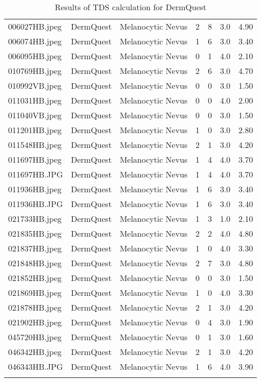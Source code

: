 \begin{longtable}{ | l | l | l | l | l | l | l |}
006027HB.jpeg & DermQuest & Melanocytic Nevus & 2 & 8 & 3.0 & 4.90 \\
006074HB.jpeg & DermQuest & Melanocytic Nevus & 1 & 6 & 3.0 & 3.40 \\
006095HB.jpeg & DermQuest & Melanocytic Nevus & 0 & 1 & 4.0 & 2.10 \\
010769HB.jpeg & DermQuest & Melanocytic Nevus & 2 & 6 & 3.0 & 4.70 \\
010992VB.jpeg & DermQuest & Melanocytic Nevus & 0 & 0 & 3.0 & 1.50 \\
011031HB.jpeg & DermQuest & Melanocytic Nevus & 0 & 0 & 4.0 & 2.00 \\
011040VB.jpeg & DermQuest & Melanocytic Nevus & 0 & 0 & 3.0 & 1.50 \\
011201HB.jpeg & DermQuest & Melanocytic Nevus & 1 & 0 & 3.0 & 2.80 \\
011548HB.jpeg & DermQuest & Melanocytic Nevus & 2 & 1 & 3.0 & 4.20 \\
011697HB.jpeg & DermQuest & Melanocytic Nevus & 1 & 4 & 4.0 & 3.70 \\
011697HB.JPG & DermQuest & Melanocytic Nevus & 1 & 4 & 4.0 & 3.70 \\
011936HB.jpeg & DermQuest & Melanocytic Nevus & 1 & 6 & 3.0 & 3.40 \\
011936HB.JPG & DermQuest & Melanocytic Nevus & 1 & 6 & 3.0 & 3.40 \\
021733HB.jpeg & DermQuest & Melanocytic Nevus & 1 & 3 & 1.0 & 2.10 \\
021835HB.jpeg & DermQuest & Melanocytic Nevus & 2 & 2 & 4.0 & 4.80 \\
021837HB.jpeg & DermQuest & Melanocytic Nevus & 1 & 0 & 4.0 & 3.30 \\
021848HB.jpeg & DermQuest & Melanocytic Nevus & 2 & 7 & 3.0 & 4.80 \\
021852HB.jpeg & DermQuest & Melanocytic Nevus & 0 & 0 & 3.0 & 1.50 \\
021869HB.jpeg & DermQuest & Melanocytic Nevus & 1 & 0 & 4.0 & 3.30 \\
021878HB.jpeg & DermQuest & Melanocytic Nevus & 2 & 1 & 3.0 & 4.20 \\
021902HB.jpeg & DermQuest & Melanocytic Nevus & 0 & 4 & 3.0 & 1.90 \\
045720HB.jpeg & DermQuest & Melanocytic Nevus & 0 & 1 & 3.0 & 1.60 \\
046342HB.jpeg & DermQuest & Melanocytic Nevus & 2 & 1 & 3.0 & 4.20 \\
046343HB.JPG & DermQuest & Melanocytic Nevus & 1 & 6 & 4.0 & 3.90 \\
\hline
\caption{Results of TDS calculation for DermQuest}
\label{fig:tds_results_dermq}
\end{longtable}
